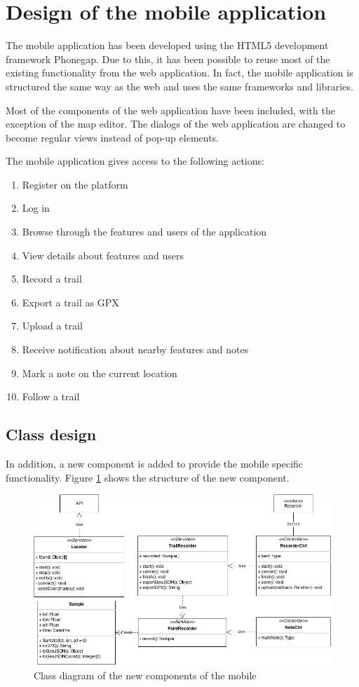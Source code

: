 \FloatBarrier
\section{Design of the mobile application}\label{sec:mobileappdesign}

The mobile application has been developed using the HTML5 development framework Phonegap. Due to this, it has been possible to reuse most of the existing functionality from the web application. In fact, the mobile application is structured the same way as the web and uses the same frameworks and libraries.

Most of the components of the web application have been included, with the exception of the map editor. The dialogs of the web application are changed to become regular views instead of pop-up elements.

The mobile application gives access to the following actions:

\begin{enumerate}
\item Register on the platform
\item Log in
\item Browse through the features and users of the application
\item View details about features and users
\item Record a trail
\item Export a trail as GPX
\item Upload a trail 
\item Receive notification about nearby features and notes
\item Mark a note on the current location
\item Follow a trail
\end{enumerate}

\subsection{Class design}

In addition, a new component is added to provide the mobile specific functionality. Figure \ref{fig:mobile-diagram} shows the structure of the new component.

\begin{figure}[ht]
  \centering
  \includegraphics[width=.8\textwidth]{fig/mobile-diagram}
  \caption{Class diagram of the new components of the mobile}
  \label{fig:mobile-diagram}
\end{figure} 

